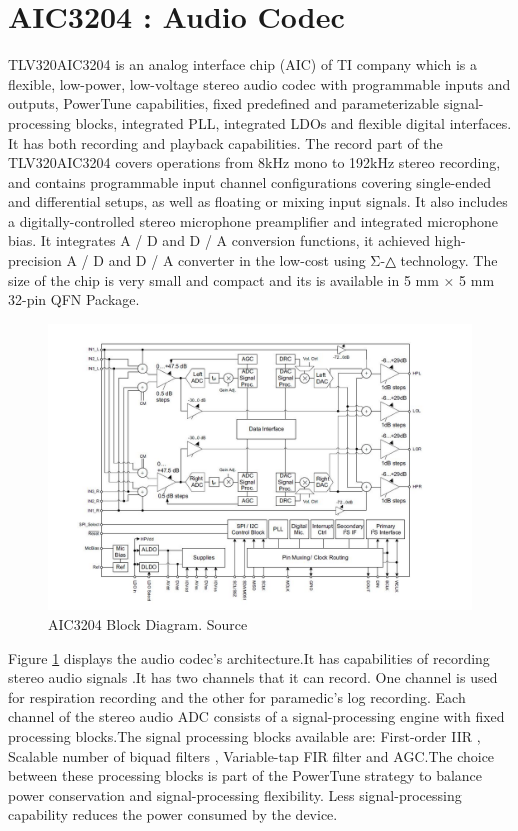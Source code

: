 \section{AIC3204 : Audio Codec}
TLV320AIC3204 is an analog interface chip (AIC) of TI company which is a flexible, low-power, low-voltage stereo audio codec with programmable inputs and outputs, PowerTune capabilities, fixed predefined and parameterizable signal-processing blocks, integrated PLL, integrated LDOs and flexible digital interfaces.  It has both recording and playback capabilities. The record part of the TLV320AIC3204 covers operations from 8kHz mono to 192kHz stereo recording, and contains programmable input channel configurations covering single-ended and differential setups, as well as floating or mixing input signals. It also includes a digitally-controlled stereo microphone preamplifier and integrated microphone bias. It integrates A / D and D / A conversion functions, it achieved high-precision A / D and D / A converter in the low-cost using Σ-△ technology. The size of the chip is very small and compact and its is available in  5 mm × 5 mm 32-pin QFN Package. 

\begin{figure}[h]
	\centering
	\includegraphics[scale = 0.5 ]{AIC3204.JPG}
	\caption{AIC3204 Block Diagram. Source \cite{audiocodec}\label{aic3204}}
\end{figure}

Figure \ref{aic3204} displays the audio codec's architecture.It has capabilities of recording stereo audio signals .It has two channels that it can record. One channel is used for respiration recording and the other for paramedic's log recording.
Each
channel of the stereo audio ADC consists of a signal-processing engine with fixed processing blocks.The signal processing blocks available are:
First-order IIR
, Scalable number of biquad filters
, Variable-tap FIR filter
and AGC.The choice between these processing blocks is part of the PowerTune strategy to balance power
conservation and signal-processing flexibility. Less signal-processing capability reduces the power
consumed by the device.
